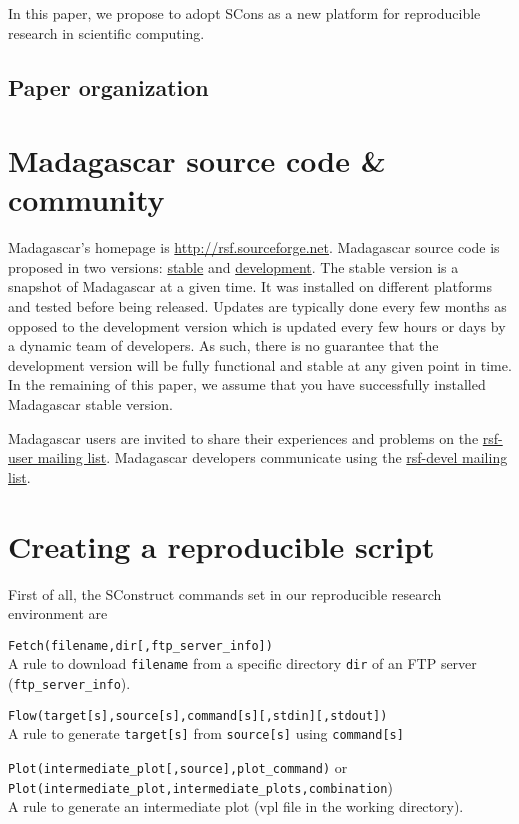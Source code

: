 In this paper, we propose to adopt SCons as a new platform for
reproducible research in scientific computing.

\subsection{Paper organization}

\newpage
\section{Madagascar source code \& community}
%
Madagascar's homepage is \url{http://rsf.sourceforge.net}. Madagascar
source code is proposed in two versions:
\href{https://sourceforge.net/project/showfiles.php?group_id=162909}{stable}
and
\href{http://rsf.sourceforge.net/wiki/index.php/Svn-url}{development}.
The stable version is a snapshot of Madagascar at a given time. It was
installed on different platforms and tested before being released.
Updates are typically done every few months as opposed to the
development version which is updated every few hours or days by a
dynamic team of developers. As such, there is no guarantee that the
development version will be fully functional and stable at any given
point in time. In the remaining of this paper, we assume that you have
successfully installed Madagascar stable version.

Madagascar users are invited to share their experiences and problems
on the \href{mailto:rsf-user@lists.sourceforge.net}{rsf-user mailing
  list}. Madagascar developers communicate using the
\href{mailto:rsf-devel@lists.sourceforge.net}{rsf-devel mailing list}.

\section{Creating a reproducible script}
%
First of all, the SConstruct commands set in our reproducible research
environment are

\noindent\texttt{Fetch(filename,dir[,ftp\_server\_info])}\\
\indent A rule to download \texttt{filename} from a specific
directory \texttt{dir} of an FTP server
(\texttt{ftp\_server\_info}).

\noindent\texttt{Flow(target[s],source[s],command[s][,stdin][,stdout])}\\
\indent A rule to generate \texttt{target[s]} from \texttt{source[s]}
using \texttt{command[s]}

\noindent\texttt{Plot(intermediate\_plot[,source],plot\_command)} or\\
\texttt{Plot(intermediate\_plot,intermediate\_plots,combination})\\
\indent A rule to generate an intermediate plot (vpl file in the
working directory).

